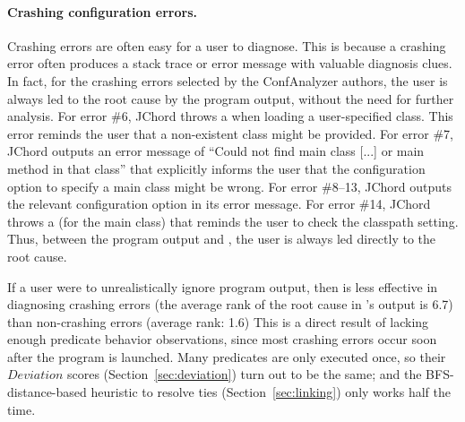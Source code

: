 
\paragraph{Crashing configuration errors.}

Crashing errors are often easy for a user to diagnose.
This is because a crashing error often produces a stack trace or error message with valuable diagnosis clues.
In fact, for the crashing errors selected by the ConfAnalyzer authors, the
user is always led to the root cause by the program output,
without the need for further analysis.
For error \#6, JChord throws a 
when loading a user-specified class. This error
reminds the user that a non-existent class might be provided.
For error \#7, JChord outputs an error message of ``Could not find main class [...]
or main method in that class'' that explicitly informs the user that
the configuration option to specify a main class might be wrong.
For error \#8--13,
JChord outputs the relevant configuration option in its error message.
For error \#14, JChord throws a 
(for the main class) that reminds the user to check the classpath setting.  
Thus, between the program output and \ourtool, the user is
always led directly to the
root cause.




If a user were to unrealistically ignore program output, then \ourtool is less effective
in diagnosing crashing errors (the average rank of the root cause
in \ourtool's output is 6.7) than non-crashing errors (average rank: 1.6)
This is a direct result of lacking enough predicate behavior observations,
since most crashing errors occur soon
after the program is launched.  Many predicates are
only executed once, so their $Deviation$ scores
 (Section~\ref{sec:deviation}) turn out to be the same; and the
 BFS-distance-based heuristic to resolve ties (Section~\ref{sec:linking}) only
works half the time.



